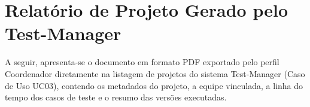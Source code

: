\chapter{Relatório de Projeto Gerado pelo Test-Manager}
\label{anexo:relatorio_pdf}

A seguir, apresenta-se o documento em formato PDF exportado pelo perfil Coordenador diretamente na listagem de projetos do sistema Test-Manager (Caso de Uso UC03), contendo os metadados do projeto, a equipe vinculada, a linha do tempo dos casos de teste e o resumo das versões executadas.



